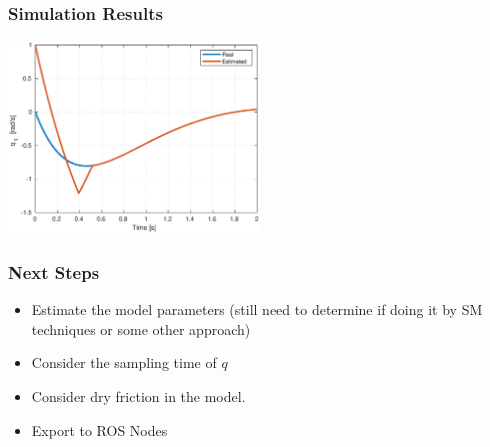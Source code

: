 \documentclass[9pt,spanish,aspectratio=1610]{beamer}
\begin{document}
\begin{frame}\frametitle{Simulation Results}
\includegraphics[width=0.5\textwidth]{Figures/est_q1.eps}  
\end{frame}

\begin{frame}\frametitle{Next Steps}
\begin{itemize}
\item Estimate the model parameters (still need to determine if doing it by SM techniques or some other approach)
\item Consider the sampling time of $q$
\item Consider dry friction in the model.
\item Export to ROS Nodes
\end{itemize}  
\end{frame}
\end{document}
